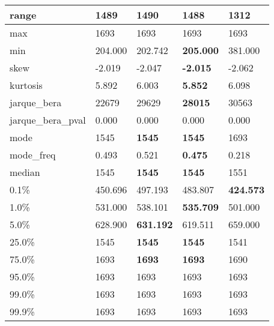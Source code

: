 \begin{table}[H]
\begin{tabular}{|l|m{10em}|m{10em}|m{10em}|m{10em}|}
\hline range & 1489 & 1490 & \bfseries 1488 & \cellcolor[rgb]{0.9, 0.54, 0.52} 1312 \\
\hline max & 1693 & 1693 & 1693 & 1693 \\
\hline min & 204.000 & 202.742 & \bfseries 205.000 & \cellcolor[rgb]{0.9, 0.54, 0.52} 381.000 \\
\hline skew & -2.019 & -2.047 & \bfseries -2.015 & \cellcolor[rgb]{0.9, 0.54, 0.52} -2.062 \\
\hline kurtosis & 5.892 & 6.003 & \bfseries 5.852 & \cellcolor[rgb]{0.9, 0.54, 0.52} 6.098 \\
\hline jarque\_bera & 22679 & 29629 & \bfseries 28015 & \cellcolor[rgb]{0.9, 0.54, 0.52} 30563 \\
\hline jarque\_bera\_pval & 0.000 & 0.000 & 0.000 & 0.000 \\
\hline mode & 1545 & \bfseries 1545 & \bfseries 1545 & \cellcolor[rgb]{0.9, 0.54, 0.52} 1693 \\
\hline mode\_freq & 0.493 & 0.521 & \bfseries 0.475 & \cellcolor[rgb]{0.9, 0.54, 0.52} 0.218 \\
\hline median & 1545 & \bfseries 1545 & \bfseries 1545 & \cellcolor[rgb]{0.9, 0.54, 0.52} 1551 \\
\hline 0.1\% & 450.696 & \cellcolor[rgb]{0.9, 0.54, 0.52} 497.193 & 483.807 & \bfseries 424.573 \\
\hline 1.0\% & 531.000 & 538.101 & \bfseries 535.709 & \cellcolor[rgb]{0.9, 0.54, 0.52} 501.000 \\
\hline 5.0\% & 628.900 & \bfseries 631.192 & 619.511 & \cellcolor[rgb]{0.9, 0.54, 0.52} 659.000 \\
\hline 25.0\% & 1545 & \bfseries 1545 & \bfseries 1545 & \cellcolor[rgb]{0.9, 0.54, 0.52} 1541 \\
\hline 75.0\% & 1693 & \bfseries 1693 & \bfseries 1693 & \cellcolor[rgb]{0.9, 0.54, 0.52} 1690 \\
\hline 95.0\% & 1693 & 1693 & 1693 & 1693 \\
\hline 99.0\% & 1693 & 1693 & 1693 & 1693 \\
\hline 99.9\% & 1693 & 1693 & 1693 & 1693 \\
\hline
\end{tabular}
\end{table}
